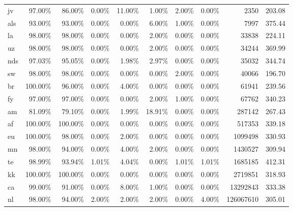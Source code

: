 \begin{table}[hbt!]
{\begin{tabular}{l|rrrr|rrr|rr}
            jv           & 97.00\%  & 86.00\%  & 0.00\% & 11.00\% & 1.00\%   & 2.00\%   & 0.00\% & 2350         & 203.08     \\
            als          & 93.00\%  & 93.00\%  & 0.00\% & 0.00\%  & 6.00\%   & 1.00\%   & 0.00\% & 7997         & 375.44     \\
            la           & 98.00\%  & 98.00\%  & 0.00\% & 0.00\%  & 2.00\%   & 0.00\%   & 0.00\% & 33838        & 224.11     \\
            uz           & 98.00\%  & 98.00\%  & 0.00\% & 0.00\%  & 2.00\%   & 0.00\%   & 0.00\% & 34244        & 369.99     \\
            nds          & 97.03\%  & 95.05\%  & 0.00\% & 1.98\%  & 2.97\%   & 0.00\%   & 0.00\% & 35032        & 344.74     \\
            sw           & 98.00\%  & 98.00\%  & 0.00\% & 0.00\%  & 0.00\%   & 2.00\%   & 0.00\% & 40066        & 196.70     \\
            br           & 100.00\% & 96.00\%  & 0.00\% & 4.00\%  & 0.00\%   & 0.00\%   & 0.00\% & 61941        & 239.56     \\
            fy           & 97.00\%  & 97.00\%  & 0.00\% & 0.00\%  & 2.00\%   & 1.00\%   & 0.00\% & 67762        & 340.23     \\
            am           & 81.09\%  & 79.10\%  & 0.00\% & 1.99\%  & 18.91\%  & 0.00\%   & 0.00\% & 287142       & 267.43     \\
            af           & 100.00\% & 100.00\% & 0.00\% & 0.00\%  & 0.00\%   & 0.00\%   & 0.00\% & 517353       & 339.18     \\
            eu           & 100.00\% & 98.00\%  & 0.00\% & 2.00\%  & 0.00\%   & 0.00\%   & 0.00\% & 1099498      & 330.93     \\
            mn           & 98.00\%  & 94.00\%  & 0.00\% & 4.00\%  & 2.00\%   & 0.00\%   & 0.00\% & 1430527      & 309.94     \\
            te           & 98.99\%  & 93.94\%  & 1.01\% & 4.04\%  & 0.00\%   & 1.01\%   & 1.01\% & 1685185      & 412.31     \\
            kk           & 100.00\% & 100.00\% & 0.00\% & 0.00\%  & 0.00\%   & 0.00\%   & 0.00\% & 2719851      & 318.93     \\
            ca           & 99.00\%  & 91.00\%  & 0.00\% & 8.00\%  & 1.00\%   & 0.00\%   & 0.00\% & 13292843     & 333.38     \\
            nl           & 98.00\%  & 94.00\%  & 2.00\% & 2.00\%  & 2.00\%   & 0.00\%   & 4.00\% & 126067610    & 305.01     \\

\end{tabular}}
\end{table}

